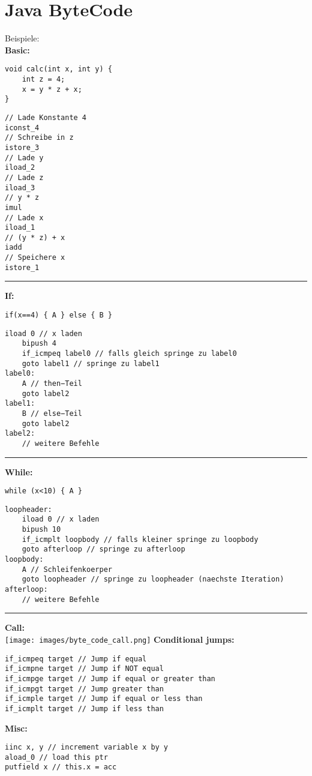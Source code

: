 \section{Java  ByteCode}
Beispiele:\\
\textbf{Basic:}
\begin{verbatim}
void calc(int x, int y) {
    int z = 4;
    x = y * z + x; 
}
\end{verbatim}
\begin{lstlisting}[language=JVMIS]
// Lade Konstante 4
iconst_4
// Schreibe in z
istore_3
// Lade y
iload_2
// Lade z
iload_3
// y * z
imul
// Lade x 
iload_1
// (y * z) + x 
iadd
// Speichere x
istore_1
\end{lstlisting}
\noindent\rule{\columnwidth}{0.4pt}
\textbf{If:}
\begin{verbatim}
if(x==4) { A } else { B }
\end{verbatim}
\begin{lstlisting}[language=JVMIS]
    iload 0 // x laden
    bipush 4
    if_icmpeq label0 // falls gleich springe zu label0 
    goto label1 // springe zu label1
label0:
    A // then−Teil
    goto label2 
label1:
    B // else−Teil
    goto label2 
label2:
    // weitere Befehle
\end{lstlisting}
\noindent\rule{\columnwidth}{0.4pt}
\textbf{While:}
\begin{verbatim}
while (x<10) { A }
\end{verbatim}
\begin{lstlisting}[language=JVMIS]
loopheader:
    iload 0 // x laden
    bipush 10
    if_icmplt loopbody // falls kleiner springe zu loopbody 
    goto afterloop // springe zu afterloop
loopbody:
    A // Schleifenkoerper
    goto loopheader // springe zu loopheader (naechste Iteration) 
afterloop:
    // weitere Befehle
\end{lstlisting}
\noindent\rule{\columnwidth}{0.4pt}
\textbf{Call:}\\
\texttt{[image: images/byte\_code\_call.png]}
\textbf{Conditional jumps:}
\begin{lstlisting}[language=JVMIS]
if_icmpeq target // Jump if equal
if_icmpne target // Jump if NOT equal
if_icmpge target // Jump if equal or greater than
if_icmpgt target // Jump greater than
if_icmple target // Jump if equal or less than
if_icmplt target // Jump if less than
\end{lstlisting}
\textbf{Misc:}
\begin{lstlisting}[language=JVMIS]
iinc x, y // increment variable x by y
aload_0 // load this ptr
putfield x // this.x = acc
\end{lstlisting}
